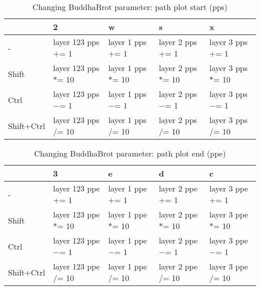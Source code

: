 \documentclass[10pt,a4paper]{article}
\begin{document}
\begin{table}[h!]
    \caption{Changing BuddhaBrot parameter: path plot start (pps)}
    \setlength{\tabcolsep}{0.0pt}
    \begin{tabularx}{\linewidth}{LLLLL}
        \toprule
                   & 2                      & w                    & s                    & x                    \\
        \midrule                                                                          
        -          & layer 123 pps $+$= 1  & layer 1 pps $+$= 1  & layer 2 pps $+$= 1  & layer 3 pps $+$= 1  \\
        Shift      & layer 123 pps $*$= 10 & layer 1 pps $*$= 10 & layer 2 pps $*$= 10 & layer 3 pps $*$= 10 \\
        Ctrl       & layer 123 pps $-$= 1  & layer 1 pps $-$= 1  & layer 2 pps $-$= 1  & layer 3 pps $-$= 1  \\
        Shift+Ctrl & layer 123 pps $/$= 10 & layer 1 pps $/$= 10 & layer 2 pps $/$= 10 & layer 3 pps $/$= 10 \\
        \bottomrule
    \end{tabularx}
\end{table}

\begin{table}[h!]
    \caption{Changing BuddhaBrot parameter: path plot end (ppe)}
    \setlength{\tabcolsep}{0.0pt}
    \begin{tabularx}{\linewidth}{LLLLL}
        \toprule
                   & 3                      & e                    & d                    & c                    \\
        \midrule                                                                          
        -          & layer 123 ppe $+$= 1  & layer 1 ppe $+$= 1  & layer 2 ppe $+$= 1  & layer 3 ppe $+$= 1  \\
        Shift      & layer 123 ppe $*$= 10 & layer 1 ppe $*$= 10 & layer 2 ppe $*$= 10 & layer 3 ppe $*$= 10 \\
        Ctrl       & layer 123 ppe $-$= 1  & layer 1 ppe $-$= 1  & layer 2 ppe $-$= 1  & layer 3 ppe $-$= 1  \\
        Shift+Ctrl & layer 123 ppe $/$= 10 & layer 1 ppe $/$= 10 & layer 2 ppe $/$= 10 & layer 3 ppe $/$= 10 \\
        \bottomrule
    \end{tabularx}
\end{table}
\end{document}
